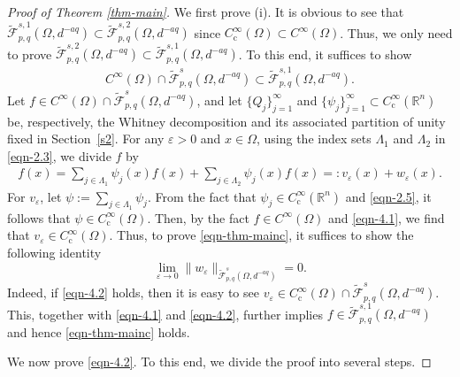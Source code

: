 \documentclass[11pt,twoside]{article}
\def\fz{\infty }
\def\boz{{\Omega}}
\def\we{w_{\varepsilon}}
\def\huae{\varepsilon}
\theoremstyle{mylem}
\theoremstyle{definition}
\numberwithin{equation}{section}
\begin{document}
\begin{proof}[Proof of Theorem \ref{thm-main}]
We first prove (i). 
It is obvious to see that $\widetilde{\mathcal{F}}_{p,q}^{s,1}(\boz,d^{-aq}) \subset\widetilde{\mathcal{F}}_{p,q}^{s,2}(\boz,d^{-aq})$
since $C_{\mathrm{c}}^\infty(\boz)\subset C^\infty(\boz)$. Thus, we only need to prove $\widetilde{\mathcal{F}}_{p,q}^{s,2}(\boz,d^{-aq})\subset\widetilde{\mathcal{F}}_{p,q}^{s,1}(\boz,d^{-aq})$. To this end, it suffices to show 
\begin{align}\label{eqn-thm-mainc}
C^\infty(\boz)\cap \widetilde{\mathcal F}_{p, q}^{s}(\boz,d^{-aq})
\subset\widetilde{\mathcal{F}}_{p,q}^{s,1}(\boz,d^{-aq}).
\end{align}
Let \( f \in C^\infty(\boz)\cap\widetilde{\mathcal F}_{p, q}^{s}(\boz,d^{-aq}) \), and let \( \{Q_j\}_{j=1}^{\infty} \) and \( \{\psi_j\}_{j=1}^{\infty} \subset C_{\mathrm{c}}^\infty(\mathbb{R}^n) \) be, respectively, the Whitney decomposition and its associated partition of unity fixed in Section~\ref{s2}.
For any \( \varepsilon > 0 \) and \( x \in \Omega \), using the index sets $\Lambda_1$ and 
$\Lambda_2$ in \eqref{eqn-2.3}, we divide $f$ by    
\begin{align}\label{eqn-4.1}
f(x)= \sum_{j \in \Lambda_1} \psi_j(x) f(x) + \sum_{j \in \Lambda_2} \psi_j(x) f(x) 
=: v_{\varepsilon}(x) + w_{\varepsilon}(x).
\end{align}
For \( v_{\varepsilon} \), let \( \psi := \sum_{j \in \Lambda_1} \psi_j \). From the fact that $\psi_j\in C_{\mathrm{c}}^\infty(\mathbb{R}^n) $ and \eqref{eqn-2.5}, it follows that \( \psi \in C_{\mathrm{c}}^{\fz}(\boz) \). Then, by the fact \( f \in C^\infty(\boz) \) and \eqref{eqn-4.1}, we find that 
$v_{\varepsilon}\in C_{\mathrm{c}}^{\fz}(\boz)$.  Thus, to prove \eqref{eqn-thm-mainc}, it suffices 
to show the following identity
\begin{equation}\label{eqn-4.2}
\lim_{\huae \to 0} \| \we \|_{\widetilde{\mathcal F}_{p, q}^{s}(\boz,d^{-aq}) }=0.
\end{equation}
Indeed, if \eqref{eqn-4.2} holds, then it is easy to see 
$v_{\varepsilon}\in C_{\mathrm{c}}^{\fz}(\boz)\cap\widetilde{\mathcal F}_{p, q}^{s}(\boz,d^{-aq}) $. This, together with \eqref{eqn-4.1} and \eqref{eqn-4.2}, further implies $f\in\widetilde{\mathcal{F}}_{p,q}^{s,1}(\boz,d^{-aq})$ and hence \eqref{eqn-thm-mainc} holds. 

We now prove \eqref{eqn-4.2}. To this end, we divide the proof into several 
steps.


\end{proof}
\end{document}
